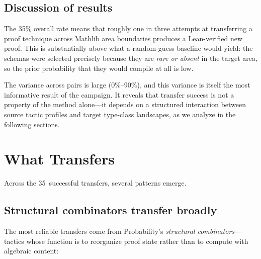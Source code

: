 \documentclass[11pt]{article}
\theoremstyle{definition}
\theoremstyle{remark}
\begin{document}
\subsection{Discussion of results}

The 35\% overall rate means that roughly one in three attempts at
transferring a proof technique across Mathlib area boundaries
produces a Lean-verified new proof.  This is substantially above
what a random-guess baseline would yield: the schemas were selected
precisely because they are \emph{rare or absent} in the target area,
so the prior probability that they would compile at all is low.

The variance across pairs is large (0\%--90\%), and this variance
is itself the most informative result of the campaign.  It reveals
that transfer success is not a property of the method alone---it
depends on a structured interaction between source tactic profiles
and target type-class landscapes, as we analyze in the following
sections.

\section{What Transfers}\label{sec:transfers}

Across the 35~successful transfers, several patterns emerge.

\subsection{Structural combinators transfer broadly}

The most reliable transfers come from Probability's
\emph{structural combinators}---tactics whose function is to
reorganize proof state rather than to compute with algebraic
content:
\end{document}
